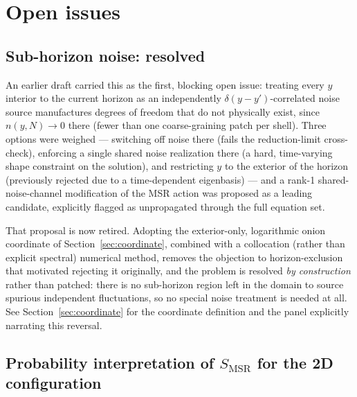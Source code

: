 \documentclass[a4paper,11pt]{article}
\newcommand{\Ny}{N}                          %
\newcommand{\yco}{y}                         %
\newcommand{\ncount}{n}                      %
\begin{document}
\section{Open issues}
\label{sec:open-issues}

\subsection{Sub-horizon noise: resolved}

An earlier draft carried this as the first, blocking open issue: treating
every $\yco$ interior to the current horizon as an independently
$\delta(\yco-\yco')$-correlated noise source manufactures degrees of
freedom that do not physically exist, since $\ncount(\yco,\Ny)\to0$ there
(fewer than one coarse-graining patch per shell). Three options were
weighed --- switching off noise there (fails the reduction-limit
cross-check), enforcing a single shared noise realization there (a hard,
time-varying shape constraint on the solution), and restricting $\yco$ to
the exterior of the horizon (previously rejected due to a
time-dependent eigenbasis) --- and a rank-1 shared-noise-channel
modification of the MSR action was proposed as a leading candidate,
explicitly flagged as unpropagated through the full equation set.

That proposal is now retired. Adopting the exterior-only, logarithmic
onion coordinate of Section~\ref{sec:coordinate}, combined with a
collocation (rather than explicit spectral) numerical method, removes the
objection to horizon-exclusion that motivated rejecting it originally,
and the problem is resolved \emph{by construction} rather than patched:
there is no sub-horizon region left in the domain to source spurious
independent fluctuations, so no special noise treatment is needed at all.
See Section~\ref{sec:coordinate} for the coordinate definition and the
panel explicitly narrating this reversal.

\subsection{Probability interpretation of $S_{\mathrm{MSR}}$ for the 2D configuration}
\end{document}
